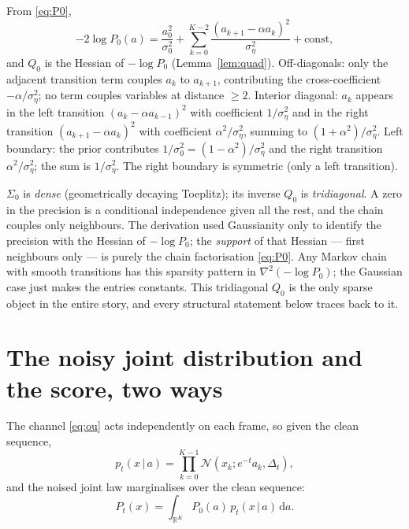 \documentclass[11pt]{article}
\theoremstyle{definition}
\newcommand{\R}{\mathbb{R}}
\newcommand{\N}{\mathcal{N}}
\newcommand{\Sig}{\Sigma}
\newcommand{\Dt}{\Delta_t}
\newcommand{\given}{\,|\,}
\newcommand{\dd}{\mathrm{d}}
\begin{document}
\begin{derivation}
From \eqref{eq:P0},
\[
  -2\log P_0(a)=\frac{a_0^2}{\sigma_0^2}
  +\sum_{k=0}^{K-2}\frac{(a_{k+1}-\alpha a_k)^2}{\sigma_\eta^2}+\text{const},
\]
and $Q_0$ is the Hessian of $-\log P_0$ (Lemma~\ref{lem:quad}). Off-diagonals:
only the adjacent transition term couples $a_k$ to $a_{k+1}$, contributing the
cross-coefficient $-\alpha/\sigma_\eta^2$; no term couples variables at
distance $\ge2$. Interior diagonal: $a_k$ appears in the left transition
$(a_k-\alpha a_{k-1})^2$ with coefficient $1/\sigma_\eta^2$ and in the right
transition $(a_{k+1}-\alpha a_k)^2$ with coefficient
$\alpha^2/\sigma_\eta^2$, summing to $(1+\alpha^2)/\sigma_\eta^2$. Left
boundary: the prior contributes $1/\sigma_0^2=(1-\alpha^2)/\sigma_\eta^2$ and
the right transition $\alpha^2/\sigma_\eta^2$; the sum is $1/\sigma_\eta^2$.
The right boundary is symmetric (only a left transition).
\end{derivation}

\begin{intuition}
$\Sig_0$ is \emph{dense} (geometrically decaying Toeplitz); its inverse $Q_0$
is \emph{tridiagonal}. A zero in the precision is a conditional independence
given all the rest, and the chain couples only neighbours. The derivation used
Gaussianity only to identify the precision with the Hessian of $-\log P_0$;
the \emph{support} of that Hessian --- first neighbours only --- is purely the
chain factorisation \eqref{eq:P0}. Any Markov chain with smooth transitions
has this sparsity pattern in $\nabla^2(-\log P_0)$; the Gaussian case just
makes the entries constants. This tridiagonal $Q_0$ is the only sparse object
in the entire story, and every structural statement below traces back to it.
\end{intuition}

\section{The noisy joint distribution and the score, two ways}\label{sec:noisy}

The channel \eqref{eq:ou} acts independently on each frame, so given the clean
sequence,
\begin{equation}\label{eq:likelihood}
  p_t(x\given a)=\prod_{k=0}^{K-1}\N(x_k;e^{-t}a_k,\Dt),
\end{equation}
and the noised joint law marginalises over the clean sequence:
\begin{equation}\label{eq:Pt-int}
  P_t(x)=\int_{\R^K} P_0(a)\,p_t(x\given a)\,\dd a .
\end{equation}
\end{document}
